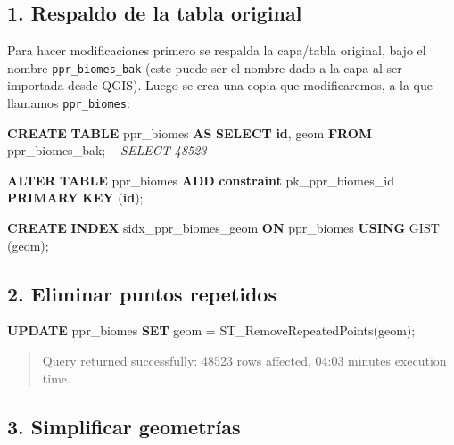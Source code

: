 \documentclass[spanish,]{article}
\newenvironment{Shaded}{}{}
\newcommand{\KeywordTok}[1]{\textcolor[rgb]{0.00,0.44,0.13}{\textbf{{#1}}}}
\newcommand{\CommentTok}[1]{\textcolor[rgb]{0.38,0.63,0.69}{\textit{{#1}}}}
\newcommand{\NormalTok}[1]{{#1}}
\begin{document}
\subsection{1. Respaldo de la tabla
original}\label{respaldo-de-la-tabla-original}

Para hacer modificaciones primero se respalda la capa/tabla original,
bajo el nombre \texttt{ppr\_biomes\_bak} (este puede ser el nombre dado
a la capa al ser importada desde QGIS). Luego se crea una copia que
modificaremos, a la que llamamos \texttt{ppr\_biomes}:

\begin{Shaded}
\begin{Highlighting}[]
\KeywordTok{CREATE} \KeywordTok{TABLE} \NormalTok{ppr_biomes }\KeywordTok{AS} 
  \KeywordTok{SELECT} \KeywordTok{id}\NormalTok{, geom }\KeywordTok{FROM} \NormalTok{ppr_biomes_bak;}
\CommentTok{-- SELECT 48523}

\KeywordTok{ALTER} \KeywordTok{TABLE} \NormalTok{ppr_biomes }\KeywordTok{ADD} \KeywordTok{constraint} \NormalTok{pk_ppr_biomes_id }\KeywordTok{PRIMARY} \KeywordTok{KEY} \NormalTok{(}\KeywordTok{id}\NormalTok{);}

\KeywordTok{CREATE} \KeywordTok{INDEX} \NormalTok{sidx_ppr_biomes_geom }\KeywordTok{ON} \NormalTok{ppr_biomes }\KeywordTok{USING} \NormalTok{GIST (geom);}
\end{Highlighting}
\end{Shaded}

\subsection{2. Eliminar puntos
repetidos}\label{eliminar-puntos-repetidos}

\begin{Shaded}
\begin{Highlighting}[]
\KeywordTok{UPDATE} \NormalTok{ppr_biomes }\KeywordTok{SET} \NormalTok{geom = ST_RemoveRepeatedPoints(geom);}
\end{Highlighting}
\end{Shaded}

\begin{quote}
Query returned successfully: 48523 rows affected, 04:03 minutes
execution time.
\end{quote}

\subsection{3. Simplificar geometrías}\label{simplificar-geometruxedas}
\end{document}
